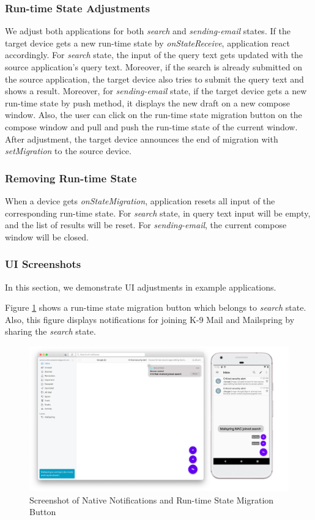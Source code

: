 \subsubsection{Run-time State Adjustments}
We adjust both applications for both \textit{search} and \textit{sending-email} states. If the target device gets a new run-time state by \textit{onStateReceive}, application react accordingly. For \textit{search} state, the input of the query text gets updated with the source application's query text. Moreover, if the search is already submitted on the source application, the target device also tries to submit the query text and shows a result. Moreover, for \textit{sending-email} state, if the target device gets a new run-time state by push method, it displays the new draft on a new compose window. Also, the user can click on the run-time state migration button on the compose window and pull and push the run-time state of the current window. After adjustment, the target device announces the end of migration with \textit{setMigration} to the source device.

\subsubsection{Removing Run-time State}
When a device gets \textit{onStateMigration}, application resets all input of the corresponding run-time state. For \textit{search} state, in query text input will be empty, and the list of results will be reset. For \textit{sending-email}, the current compose window will be closed.

\subsubsection{UI Screenshots}
In this section, we demonstrate UI adjustments in example applications.

Figure \ref{fig:adapt-noti} shows a run-time state migration button which belongs to \textit{search} state. Also, this figure displays notifications for joining K-9 Mail and Mailspring by sharing the \textit{search} state.


\FloatBarrier
\begin{figure}[H]
    \includegraphics[width=\linewidth]{../figures/adapt-noti.png}
    \centering
    \caption{Screenshot of Native Notifications and Run-time State Migration Button}
    \label{fig:adapt-noti}
\end{figure}
\FloatBarrier

